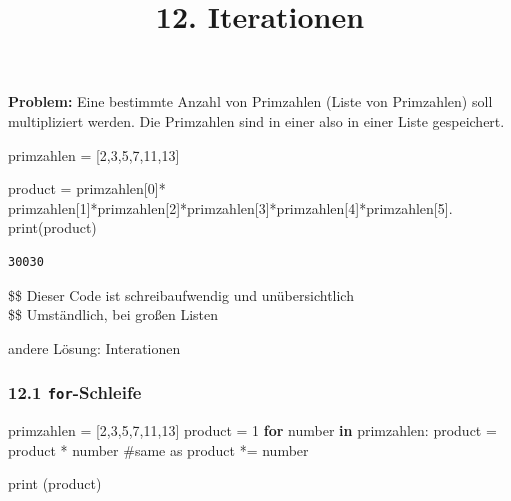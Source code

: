 \documentclass[
  11pt,
  a4paper,
  DIV=11,
  numbers=noendperiod]{scrartcl}
\title{12. Iterationen}
\author{}
\date{}
\newenvironment{Shaded}{\begin{snugshade}}{\end{snugshade}}
\newcommand{\BuiltInTok}[1]{\textcolor[rgb]{0.00,0.23,0.31}{#1}}
\newcommand{\CommentTok}[1]{\textcolor[rgb]{0.37,0.37,0.37}{#1}}
\newcommand{\ControlFlowTok}[1]{\textcolor[rgb]{0.00,0.23,0.31}{\textbf{#1}}}
\newcommand{\DecValTok}[1]{\textcolor[rgb]{0.68,0.00,0.00}{#1}}
\newcommand{\KeywordTok}[1]{\textcolor[rgb]{0.00,0.23,0.31}{\textbf{#1}}}
\newcommand{\NormalTok}[1]{\textcolor[rgb]{0.00,0.23,0.31}{#1}}
\newcommand{\OperatorTok}[1]{\textcolor[rgb]{0.37,0.37,0.37}{#1}}
\begin{document}
\maketitle


\textbf{Problem:} Eine bestimmte Anzahl von Primzahlen (Liste von
Primzahlen) soll multipliziert werden. Die Primzahlen sind in einer also
in einer Liste gespeichert.

\begin{Shaded}
\begin{Highlighting}[numbers=left,,]
\NormalTok{primzahlen }\OperatorTok{=}\NormalTok{ [}\DecValTok{2}\NormalTok{,}\DecValTok{3}\NormalTok{,}\DecValTok{5}\NormalTok{,}\DecValTok{7}\NormalTok{,}\DecValTok{11}\NormalTok{,}\DecValTok{13}\NormalTok{]}

\NormalTok{product }\OperatorTok{=}\NormalTok{ primzahlen[}\DecValTok{0}\NormalTok{]}\OperatorTok{*}\NormalTok{ primzahlen[}\DecValTok{1}\NormalTok{]}\OperatorTok{*}\NormalTok{primzahlen[}\DecValTok{2}\NormalTok{]}\OperatorTok{*}\NormalTok{primzahlen[}\DecValTok{3}\NormalTok{]}\OperatorTok{*}\NormalTok{primzahlen[}\DecValTok{4}\NormalTok{]}\OperatorTok{*}\NormalTok{primzahlen[}\DecValTok{5}\NormalTok{]. }
\BuiltInTok{print}\NormalTok{(product) }
\end{Highlighting}
\end{Shaded}

\begin{verbatim}
30030
\end{verbatim}

\$\Rightarrow \$ Dieser Code ist schreibaufwendig und unübersichtlich\\
\$\Rightarrow \$ Umständlich, bei großen Listen

andere Lösung: Interationen

\subsubsection{\texorpdfstring{12.1
\texttt{for}-Schleife}{12.1 for-Schleife}}\label{for-schleife}

\begin{Shaded}
\begin{Highlighting}[numbers=left,,]
\NormalTok{primzahlen }\OperatorTok{=}\NormalTok{ [}\DecValTok{2}\NormalTok{,}\DecValTok{3}\NormalTok{,}\DecValTok{5}\NormalTok{,}\DecValTok{7}\NormalTok{,}\DecValTok{11}\NormalTok{,}\DecValTok{13}\NormalTok{]}
\NormalTok{product }\OperatorTok{=} \DecValTok{1}
\ControlFlowTok{for}\NormalTok{ number }\KeywordTok{in}\NormalTok{ primzahlen:}
\NormalTok{    product }\OperatorTok{=}\NormalTok{ product }\OperatorTok{*}\NormalTok{ number }\CommentTok{\#same as product *= number}

\BuiltInTok{print}\NormalTok{ (product)}
\end{Highlighting}
\end{Shaded}
\end{document}
